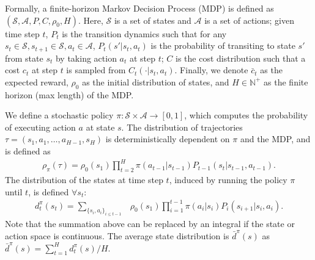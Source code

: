 \documentclass{article}
\begin{document}
Formally, a finite-horizon Markov Decision Process (MDP) is defined as $(\mathcal{S}, \mathcal{A}, P, C, \rho_0, H)$. Here, $\mathcal{S}$ is a set of states and $\mathcal{A}$ is a set of actions; given time step $t$, $P_t$ is the transition dynamics such that for any $s_t\in\mathcal{S},s_{t+1}\in\mathcal{S}, a_t\in\mathcal{A}$, $P_t(s'|s_t, a_t)$ is the probability of transiting to state $s'$ from state $s_t$ by taking action $a_t$ at step $t$; $C$ is the cost distribution such that a cost $c_t$ at step $t$ is sampled from $C_t(\cdot | s_t, a_t)$. Finally, we denote $\bar{c}_t$ as the expected reward, $\rho_0$ as the initial distribution of states, and $H\in\mathbb{N}^+$ as the finite horizon (max length) of the MDP. 

We define a stochastic policy $\pi: \mathcal{S}\times\mathcal{A}\to [0,1]$, which computes the probability of executing action $a$ at state $s$. The distribution of trajectories $\tau = (s_1, a_1, \hdots,a_{H-1}, s_H)$ is deterministically dependent on $\pi$ and the MDP, and is defined as
\begin{align}
\rho_{\pi}(\tau) = \rho_0(s_1) \prod_{t=2}^{H} \pi(a_{t-1}|s_{t-1})P_{t-1}(s_t|s_{t-1}, a_{t-1}).\nonumber
\end{align}
%
%
The distribution of the states at time step $t$, induced by running the policy $\pi$ until $t$, is defined  $\forall s_t$:
\begin{align}
d_t^{\pi}(s_{t}) = \sum_{\{s_i,a_i\}_{i\leq t-1}} &\rho_{0}(s_1)\prod_{i=1}^{t-1}\pi(a_i|s_i)P_{i}(s_{i+1}|s_{i},a_{i}). \nonumber
\end{align} Note that the summation above can be replaced by an integral if the state or action space is continuous. The average state distribution is $\bar{d}^{\pi}(s)$ as $\bar{d}^{\pi}(s) = \sum_{t=1}^H d_t^{\pi}(s) / H$.


\end{document}
